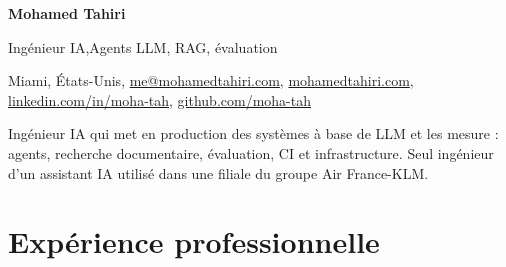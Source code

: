 \documentclass[a4paper,10pt]{article}
\begin{document}

{\color{accent}\fontsize{22}{24}\selectfont\bfseries Mohamed Tahiri}\par
\vspace{3pt}
{\large Ingénieur IA\sep Agents LLM, RAG, évaluation}\par
\vspace{3pt}
{\small Miami, États-Unis\sep
\href{mailto:me@mohamedtahiri.com}{me@mohamedtahiri.com}\sep
\href{https://mohamedtahiri.com}{mohamedtahiri.com}\sep
\href{https://linkedin.com/in/moha-tah}{linkedin.com/in/moha-tah}\sep
\href{https://github.com/moha-tah}{github.com/moha-tah}}\par
\vspace{5pt}
Ingénieur IA qui met en production des systèmes à base de LLM et les mesure : agents, recherche documentaire,
évaluation, CI et infrastructure. Seul ingénieur d'un assistant IA utilisé dans une filiale du groupe Air France-KLM.

\section{Expérience professionnelle}
\end{document}
